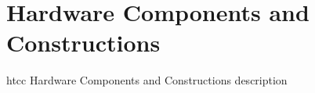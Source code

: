 \section{Hardware Components and Constructions}

htcc Hardware Components and Constructions description

